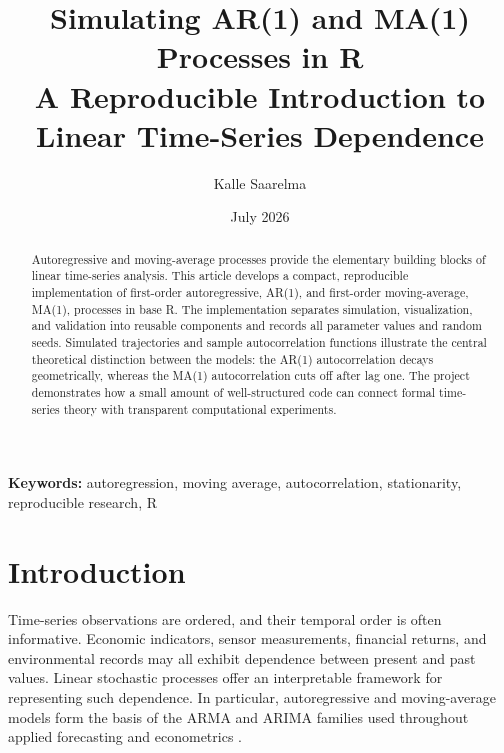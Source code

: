 \documentclass[10pt]{article}
\title{\textbf{Simulating AR(1) and MA(1) Processes in R}\\
\large A Reproducible Introduction to Linear Time-Series Dependence}
\author{Kalle Saarelma}
\date{July 2026}
\begin{document}
\maketitle

\begin{center}
\end{center}
\vspace{0.6em}

\begin{abstract}
Autoregressive and moving-average processes provide the elementary building
blocks of linear time-series analysis. This article develops a compact,
reproducible implementation of first-order autoregressive, AR(1), and
first-order moving-average, MA(1), processes in base R. The implementation
separates simulation, visualization, and validation into reusable components
and records all parameter values and random seeds. Simulated trajectories and
sample autocorrelation functions illustrate the central theoretical
distinction between the models: the AR(1) autocorrelation decays geometrically,
whereas the MA(1) autocorrelation cuts off after lag one. The project
demonstrates how a small amount of well-structured code can connect formal
time-series theory with transparent computational experiments.
\end{abstract}

\noindent\textbf{Keywords:} autoregression, moving average, autocorrelation,
stationarity, reproducible research, R

\section{Introduction}

Time-series observations are ordered, and their temporal order is often
informative. Economic indicators, sensor measurements, financial returns, and
environmental records may all exhibit dependence between present and past
values. Linear stochastic processes offer an interpretable framework for
representing such dependence. In particular, autoregressive and moving-average
models form the basis of the ARMA and ARIMA families used throughout applied
forecasting and econometrics \cite{box2015,brockwell2016}.
\end{document}
